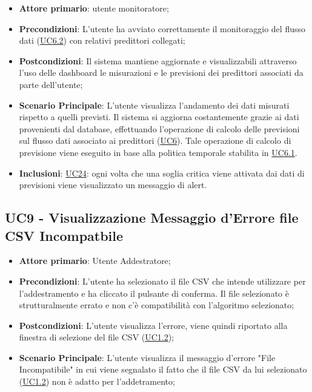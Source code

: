 		\begin{itemize}
			\item\textbf{Attore primario}: utente monitoratore;
			\item\textbf{Precondizioni}: L’utente ha avviato correttamente il monitoraggio del flusso dati (\hyperref[par:UC6.2]{UC6.2}) con relativi predittori collegati;
			\item\textbf{Postcondizioni}: Il sistema mantiene aggiornate e visualizzabili attraverso l’uso delle dashboard le misurazioni e le previsioni dei predittori associati da parte dell’utente; 
			\item\textbf{Scenario Principale}: L’utente visualizza l’andamento dei dati misurati rispetto a quelli previsti. Il sistema si aggiorna costantemente grazie ai dati provenienti dal database, effettuando l’operazione di calcolo delle previsioni sul flusso dati associato ai predittori (\hyperref[par:UC6]{UC6}). Tale operazione di calcolo di previsione viene eseguito in base alla politica temporale stabilita in \hyperref[par:UC6.1]{UC6.1}.		
			\item\textbf{Inclusioni}: \hyperref[par:UC24]{UC24}: ogni volta che una soglia critica viene attivata dai dati di previsioni viene visualizzato un messaggio di alert. 
		\end{itemize}

	
	\label{par:UC9}
	\subsection{UC9 - Visualizzazione Messaggio d'Errore file CSV Incompatbile}
		\begin{itemize}
			\item\textbf{Attore primario}: Utente Addestratore;
			\item\textbf{Precondizioni}: L’utente ha selezionato il file CSV che intende utilizzare per l'addestramento e ha cliccato il pulsante di conferma. Il file selezionato è strutturalmente errato e non c'è compatibilità con l'algoritmo selezionato;
			\item\textbf{Postcondizioni}: L'utente visualizza l'errore, viene quindi riportato alla finestra di selezione del file CSV (\hyperref[par:UC1.2]{UC1.2});
			\item\textbf{Scenario Principale}: L’utente visualizza il messaggio d'errore "File Incompatibile" in cui viene segnalato il fatto che il file CSV da lui selezionato (\hyperref[par:UC1.2]{UC1.2}) non è adatto per l'addetramento;  		
		\end{itemize}

